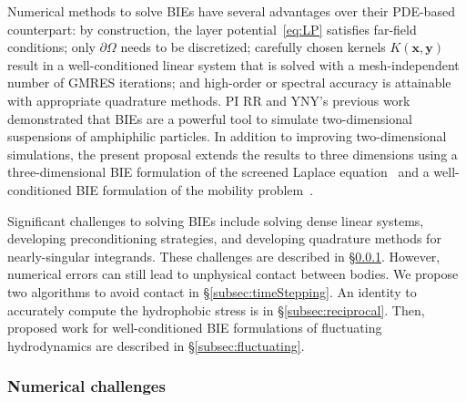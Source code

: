 Numerical methods to solve BIEs have several advantages over their
PDE-based counterpart: by construction, the layer
potential~\eqref{eq:LP} satisfies far-field conditions; only
$\partial\Omega$ needs to be discretized; carefully chosen kernels
$K(\mathbf{x},\mathbf{y})$ result in a well-conditioned linear system
that is solved with a mesh-independent number of GMRES iterations; and
high-order or spectral accuracy is attainable with appropriate
quadrature methods. PI RR and YNY's previous work~\cite{Fu2018_SIAM}
demonstrated that BIEs are a powerful tool to simulate two-dimensional
suspensions of amphiphilic particles. In addition to improving
two-dimensional simulations, the present proposal extends the results to three
dimensions using a three-dimensional BIE formulation of the
screened Laplace equation~\cite{ying_2006} and a well-conditioned BIE
formulation of the mobility problem~\cite{manasthesis, rac-gre2016}.

Significant challenges to solving BIEs include solving dense linear
systems, developing preconditioning strategies, and developing
quadrature methods for nearly-singular integrands. These
challenges are described in \S\ref{subsec:NumericalIssues}. However,
numerical errors can still lead to unphysical contact between bodies. We
propose two algorithms to avoid contact in \S\ref{subsec:timeStepping}.
An identity to accurately compute the hydrophobic stress is in
\S\ref{subsec:reciprocal}. Then, proposed work for well-conditioned BIE
formulations of fluctuating hydrodynamics are described in
\S\ref{subsec:fluctuating}.



\subsubsection{Numerical challenges}
\label{subsec:NumericalIssues}

